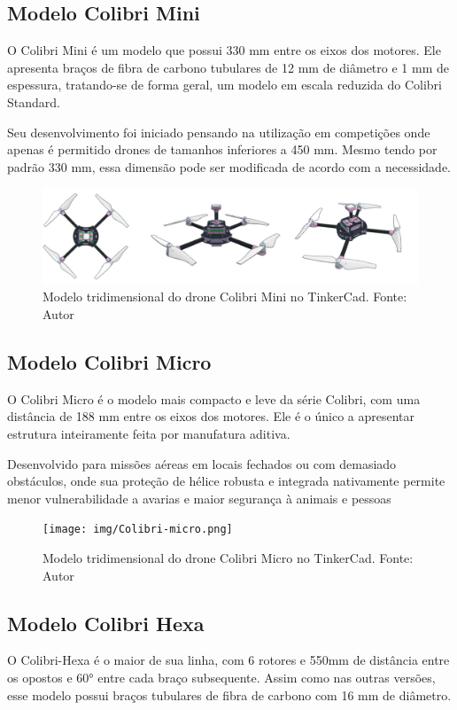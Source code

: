 \documentclass[conference]{IEEEtran}
\begin{document}
\subsection{Modelo Colibri Mini}
O Colibri Mini é um modelo que possui 330 mm entre os eixos dos motores. Ele apresenta braços de fibra de carbono tubulares de 12 mm de diâmetro e 1 mm de espessura, tratando-se de forma geral, um modelo em escala reduzida do Colibri Standard. 

Seu desenvolvimento foi iniciado pensando na utilização em competições onde apenas é permitido drones de tamanhos inferiores a 450 mm. Mesmo tendo por padrão 330 mm, essa dimensão pode ser modificada de acordo com a necessidade.

\begin{figure}[!htb]
    \centering
    \includegraphics[scale=0.14]{img/Colibri-mini.png} 
    \caption{Modelo tridimensional do drone Colibri Mini no TinkerCad. Fonte: Autor}
    \label{fig:ColibriMini}
\end{figure}

\subsection{Modelo Colibri Micro}

O Colibri Micro é o modelo mais compacto e leve da série Colibri, com uma distância de 188 mm entre os eixos dos motores. Ele é o único a apresentar estrutura inteiramente feita por manufatura aditiva.

Desenvolvido para missões aéreas em locais fechados ou com demasiado obstáculos, onde sua proteção de hélice robusta e integrada nativamente permite menor vulnerabilidade a avarias e maior segurança à animais e pessoas

\begin{figure}[!htb]
    \centering
    \texttt{[image: img/Colibri-micro.png]} 
    \caption{Modelo tridimensional do drone Colibri Micro no TinkerCad. Fonte: Autor}
    \label{fig:my_label}
\end{figure}

\subsection{Modelo Colibri Hexa}
O Colibri-Hexa é o maior de sua linha, com 6 rotores e 550mm de distância entre os opostos e 60° entre cada braço subsequente. Assim como nas outras versões, esse modelo possui braços tubulares de fibra de carbono com 16 mm de diâmetro.
\end{document}
